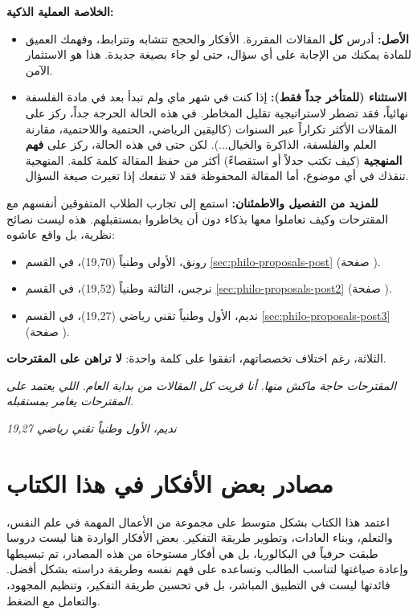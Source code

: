 \documentclass[12pt,a4paper]{book}
\newcommand{\quoteAr}[1]{%
	\begin{myquote}
		\itshape #1
	\end{myquote}
}
\begin{document}
	\textbf{الخلاصة العملية الذكية:}
	\begin{itemize}
		\item \textbf{الأصل:} أدرس \textbf{كل} المقالات المقررة. الأفكار والحجج تتشابه وتترابط، وفهمك العميق للمادة يمكنك من الإجابة على أي سؤال، حتى لو جاء بصيغة جديدة. هذا هو الاستثمار الآمن.
		\item \textbf{الاستثناء (للمتأخر جداً فقط):} إذا كنت في شهر ماي ولم تبدأ بعد في مادة الفلسفة نهائياً، فقد تضطر لاستراتيجية تقليل المخاطر. في هذه الحالة الحرجة جداً، ركز على المقالات الأكثر تكراراً عبر السنوات (كاليقين الرياضي، الحتمية واللاحتمية، مقارنة العلم والفلسفة، الذاكرة والخيال...). لكن حتى في هذه الحالة، ركز على \textbf{فهم المنهجية} (كيف تكتب جدلاً أو استقصاءً) أكثر من حفظ المقالة كلمة كلمة. المنهجية تنقذك في أي موضوع، أما المقالة المحفوظة فقد لا تنفعك إذا تغيرت صيغة السؤال.
	\end{itemize}
	
	\textbf{للمزيد من التفصيل والاطمئنان:}
	استمع إلى تجارب الطلاب المتفوقين أنفسهم مع المقترحات وكيف تعاملوا معها بذكاء دون أن يخاطروا بمستقبلهم. هذه ليست نصائح نظرية، بل واقع عاشوه:
	\begin{itemize}
		\item رونق، الأولى وطنياً (19,70)، في القسم \ref{sec:philo-proposals-post} (صفحة \pageref{sec:philo-proposals-post}).
		\item نرجس، الثالثة وطنياً (19,52)، في القسم \ref{sec:philo-proposals-post2} (صفحة \pageref{sec:philo-proposals-post2}).
		\item نديم، الأول وطنياً تقني رياضي (19,27)، في القسم \ref{sec:philo-proposals-post3} (صفحة \pageref{sec:philo-proposals-post3}).
	\end{itemize}
	
	الثلاثة، رغم اختلاف تخصصاتهم، اتفقوا على كلمة واحدة: \textbf{لا تراهن على المقترحات}.
	
	\quoteAr{المقترحات حاجة ماكش منها. أنا قريت كل المقالات من بداية العام. اللي يعتمد على المقترحات يغامر بمستقبله.}
	\textit{ نديم، الأول وطنياً تقني رياضي 19,27}




\chapter*{مصادر بعض الأفكار في هذا الكتاب}

اعتمد هذا الكتاب بشكل متوسط على مجموعة من الأعمال المهمة في علم النفس، والتعلم، وبناء العادات، وتطوير طريقة التفكير. بعض الأفكار الواردة هنا ليست دروسا طبقت حرفياً في البكالوريا، بل هي أفكار مستوحاة من هذه المصادر، تم تبسيطها وإعادة صياغتها لتناسب الطالب وتساعده على فهم نفسه وطريقة دراسته بشكل أفضل. فائدتها ليست في التطبيق المباشر، بل في تحسين طريقة التفكير، وتنظيم المجهود، والتعامل مع الضغط.
\end{document}
